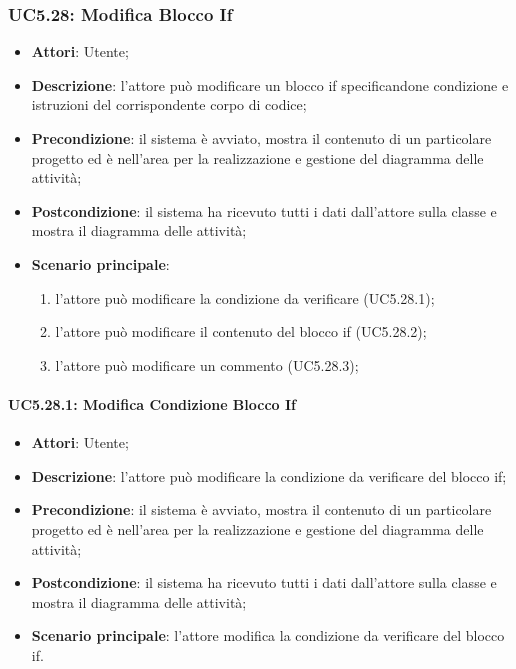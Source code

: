\subsubsection{UC5.28: Modifica Blocco If}
\label{UC5.28}
\begin{itemize}
	\item \textbf{Attori}: Utente;
	\item \textbf{Descrizione}: l'attore può modificare un blocco if specificandone condizione e istruzioni del corrispondente corpo di codice;
	\item \textbf{Precondizione}: il sistema è avviato, mostra il contenuto di un particolare progetto ed è nell'area per la realizzazione e gestione del diagramma delle attività;
	\item \textbf{Postcondizione}: il sistema ha ricevuto tutti i dati dall'attore sulla classe e mostra il diagramma delle attività;
	\item \textbf{Scenario principale}:
	\begin{enumerate}
		\item l'attore può modificare la condizione da verificare (UC5.28.1);
		\item l'attore può modificare il contenuto del blocco if (UC5.28.2);
		\item l'attore può modificare un commento (UC5.28.3);
	\end{enumerate}
\end{itemize}

\paragraph{UC5.28.1: Modifica Condizione Blocco If}
\label{UC5.28.1}
\begin{itemize}
	\item \textbf{Attori}: Utente;
	\item \textbf{Descrizione}: l'attore può modificare la condizione da verificare del blocco if;
	\item \textbf{Precondizione}: il sistema è avviato, mostra il contenuto di un particolare progetto ed è nell'area per la realizzazione e gestione del diagramma delle attività;
	\item \textbf{Postcondizione}: il sistema ha ricevuto tutti i dati dall'attore sulla classe e mostra il diagramma delle attività;
	\item \textbf{Scenario principale}: l'attore modifica la condizione da verificare del blocco if.
\end{itemize}

